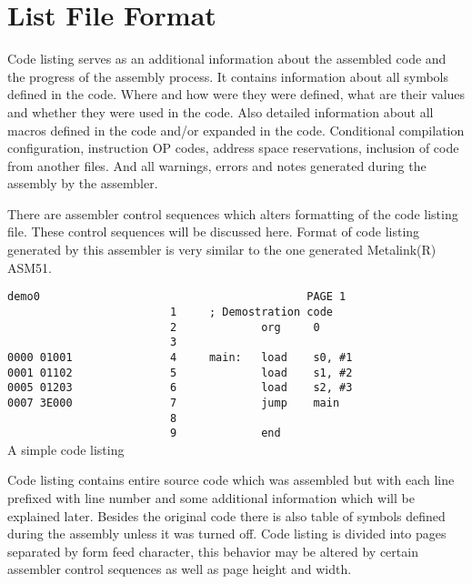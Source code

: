 \clearpage
\section{List File Format}
    Code listing serves as an additional information about the assembled code and the progress of the assembly process. It contains information about all symbols defined in the code. Where and how were they were defined, what are their values and whether they were used in the code. Also detailed information about all macros defined in the code and/or expanded in the code. Conditional compilation configuration, instruction OP codes, address space reservations, inclusion of code from another files. And all warnings, errors and notes generated during the assembly by the assembler.

    There are assembler control sequences which alters formatting of the code listing file. These control sequences will be discussed here. Format of code listing generated by this assembler is very similar to the one generated Metalink(R) ASM51.

    \begin{code}[h]
        \mysmallfont{}
        \verb'demo0                                         PAGE 1'\\
        \verb'                         1     ; Demostration code'\\
        \verb'                         2             org     0'\\
        \verb'                         3'\\
        \verb'0000 01001               4     main:   load    s0, #1'\\
        \verb'0001 01102               5             load    s1, #2'\\
        \verb'0005 01203               6             load    s2, #3'\\
        \verb'0007 3E000               7             jump    main'\\
        \verb'                         8'\\
        \verb'                         9             end'\\
        \caption{A simple code listing}
    \end{code}

    Code listing contains entire source code which was assembled but with each line prefixed with line number and some additional information which will be explained later. Besides the original code there is also table of symbols defined during the assembly unless it was turned off. Code listing is divided into pages separated by form feed character, this behavior may be altered by certain assembler control sequences as well as page height and width.


